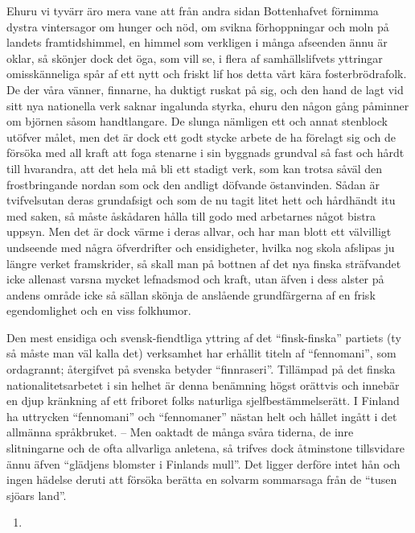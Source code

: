Ehuru vi tyvärr äro mera vane att från andra sidan Bottenhafvet förnimma
dystra vintersagor om hunger och nöd, om svikna förhoppningar och moln
på landets framtidshimmel, en himmel som verkligen i många afseenden
ännu är oklar, så skönjer dock det öga, som vill se, i flera af
samhällslifvets yttringar omisskänneliga spår af ett nytt och friskt lif
hos detta vårt kära fosterbrödrafolk. De der våra vänner, finnarne, ha
duktigt ruskat på sig, och den hand de lagt vid sitt nya nationella verk
saknar ingalunda styrka, ehuru den någon gång påminner om björnen såsom
handtlangare. De slunga nämligen ett och annat stenblock utöfver målet,
men det är dock ett godt stycke arbete de ha förelagt sig och de försöka
med all kraft att foga stenarne i sin byggnads grundval så fast och
hårdt till hvarandra, att det hela må bli ett stadigt verk, som kan
trotsa såväl den frostbringande nordan som ock den andligt döfvande
östanvinden. Sådan är tvifvelsutan deras grundafsigt och som de nu tagit
litet hett och hårdhändt itu med saken, så måste åskådaren hålla till
godo med arbetarnes något bistra uppsyn. Men det är dock värme i deras
allvar, och har man blott ett välvilligt undseende med några
öfverdrifter och ensidigheter, hvilka nog skola afslipas ju längre
verket framskrider, så skall man på bottnen af det nya finska
sträfvandet icke allenast varsna mycket lefnadsmod och kraft, utan äfven
i dess alster på andens område icke så sällan skönja de anslående
grundfärgerna af en frisk egendomlighet och en viss folkhumor.

Den mest ensidiga och svensk-fiendtliga yttring af det ``finsk-finska''
partiets (ty så måste man väl kalla det) verksamhet har erhållit titeln
af ``fennomani'', som ordagrannt; återgifvet på svenska betyder
``finnraseri''. Tillämpad på det finska nationalitetsarbetet i sin
helhet är denna benämning högst orättvis och innebär en djup kränkning
af ett friboret folks naturliga sjelfbestämmelserätt. I Finland ha
uttrycken ``fennomani'' och ``fennomaner'' nästan helt och hållet ingått
i det allmänna språkbruket. -- Men oaktadt de många svåra tiderna, de
inre slitningarne och de ofta allvarliga anletena, så trifves dock
åtminstone tillsvidare ännu äfven ``glädjens blomster i Finlands mull''.
Det ligger derföre intet hån och ingen hädelse deruti att försöka
berätta en solvarm sommarsaga från de ``tusen sjöars land''.

\begin{enumerate}
\def\labelenumi{\arabic{enumi}.}
\tightlist
\item
\end{enumerate}

